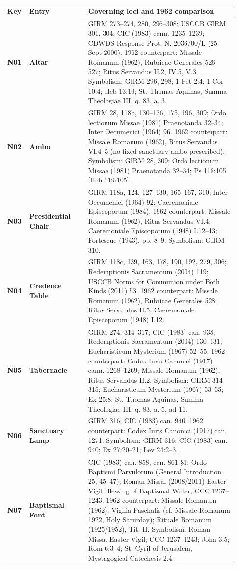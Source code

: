 {\footnotesize\begin{longtable}{>{\raggedright\arraybackslash}p{0.08\linewidth}>{\raggedright\arraybackslash}p{0.24\linewidth}>{\raggedright\arraybackslash}p{0.61\linewidth}}
\toprule
\textbf{Key} & \textbf{Entry} & \textbf{Governing loci and 1962 comparison} \\
\midrule
\endhead
\textbf{N01} & \textbf{Altar} & GIRM 273--274, 280, 296--308; USCCB GIRM 301, 304; CIC (1983) cann. 1235--1239; CDWDS Response Prot. N. 2036/00/L (25 Sept 2000). 1962 counterpart: Missale Romanum (1962), Rubricae Generales 526--527; Ritus Servandus II.2, IV.5, V.3. Symbolism: GIRM 296, 298; 1 Pet 2:4; 1 Cor 10:4; Heb 13:10; St. Thomas Aquinas, Summa Theologiae III, q. 83, a. 3. \\
\textbf{N02} & \textbf{Ambo} & GIRM 28, 118b, 130--136, 175, 196, 309; Ordo lectionum Missae (1981) Praenotanda 32--34; Inter Oecumenici (1964) 96. 1962 counterpart: Missale Romanum (1962), Ritus Servandus VI.4--5 (no fixed sanctuary ambo prescribed). Symbolism: GIRM 28, 309; Ordo lectionum Missae (1981) Praenotanda 32--34; Ps 118:105 [Heb 119:105]. \\
\textbf{N03} & \textbf{Presidential Chair} & GIRM 118a, 124, 127--130, 165--167, 310; Inter Oecumenici (1964) 92; Caeremoniale Episcoporum (1984). 1962 counterpart: Missale Romanum (1962), Ritus Servandus VI.4; Caeremoniale Episcoporum (1948) I.12--13; Fortescue (1943), pp. 8--9. Symbolism: GIRM 310. \\
\textbf{N04} & \textbf{Credence Table} & GIRM 118c, 139, 163, 178, 190, 192, 279, 306; Redemptionis Sacramentum (2004) 119; USCCB Norms for Communion under Both Kinds (2011) 53. 1962 counterpart: Missale Romanum (1962), Rubricae Generales 528; Ritus Servandus II.5; Caeremoniale Episcoporum (1948) I.12. \\
\textbf{N05} & \textbf{Tabernacle} & GIRM 274, 314--317; CIC (1983) can. 938; Redemptionis Sacramentum (2004) 130--131; Eucharisticum Mysterium (1967) 52--55. 1962 counterpart: Codex Iuris Canonici (1917) cann. 1268--1269; Missale Romanum (1962), Ritus Servandus II.2. Symbolism: GIRM 314--315; Eucharisticum Mysterium (1967) 53--55; Ex 25:8; St. Thomas Aquinas, Summa Theologiae III, q. 83, a. 5, ad 11. \\
\textbf{N06} & \textbf{Sanctuary Lamp} & GIRM 316; CIC (1983) can. 940. 1962 counterpart: Codex Iuris Canonici (1917) can. 1271. Symbolism: GIRM 316; CIC (1983) can. 940; Ex 27:20--21; Lev 24:2--3. \\
\textbf{N07} & \textbf{Baptismal Font} & CIC (1983) can. 858, can. 861 §1; Ordo Baptismi Parvulorum (General Introduction 25, 45--47); Roman Missal (2008/2011) Easter Vigil Blessing of Baptismal Water; CCC 1237--1243. 1962 counterpart: Missale Romanum (1962), Vigilia Paschalis (cf. Missale Romanum 1922, Holy Saturday); Rituale Romanum (1925/1952), Tit. II. Symbolism: Roman Missal Easter Vigil; CCC 1237--1243; John 3:5; Rom 6:3--4; St. Cyril of Jerusalem, Mystagogical Catechesis 2.4. \\

\end{longtable}}
